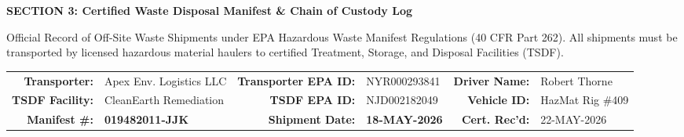 \documentclass[10pt,a4paper]{article}
\begin{document}
\newpage


\begin{tcolorbox}[colback=NavyPrimary, colframe=NavyPrimary, arc=2pt, top=2.5pt, bottom=2.5pt, left=6pt]
  \color{white}\bfseries\small\faFile\quad SECTION 3: Certified Waste Disposal Manifest \& Chain of Custody Log
\end{tcolorbox}

\vspace{-4pt}

{\fontsize{8}{9.5}\selectfont\color{TextDark}
Official Record of Off-Site Waste Shipments under EPA Hazardous Waste Manifest Regulations (40 CFR Part 262). All shipments must be transported by licensed hazardous material haulers to certified Treatment, Storage, and Disposal Facilities (TSDF).
}

\vspace{-2pt}

\begin{tcolorbox}[
  enhanced,
  colback=SlateLight,
  colframe=SlateMid,
  arc=3pt,
  boxrule=0.5pt,
  left=6pt, right=6pt, top=3.5pt, bottom=3.5pt
]
  \fontsize{7.5}{9}\selectfont
  \begin{tabularx}{\textwidth}{@{} r Y r Y r Y @{}}
    \textbf{Transporter:} & Apex Env. Logistics LLC & \textbf{Transporter EPA ID:} & NYR000293841 & \textbf{Driver Name:} & Robert Thorne \\
    \textbf{TSDF Facility:} & CleanEarth Remediation & \textbf{TSDF EPA ID:} & NJD002182049 & \textbf{Vehicle ID:} & HazMat Rig \#409 \\
    \textbf{Manifest \#:} & \textbf{019482011-JJK} & \textbf{Shipment Date:} & \textbf{18-MAY-2026} & \textbf{Cert. Rec'd:} & 22-MAY-2026
  \end{tabularx}
\end{tcolorbox}

\vspace{-2pt}
\end{document}
